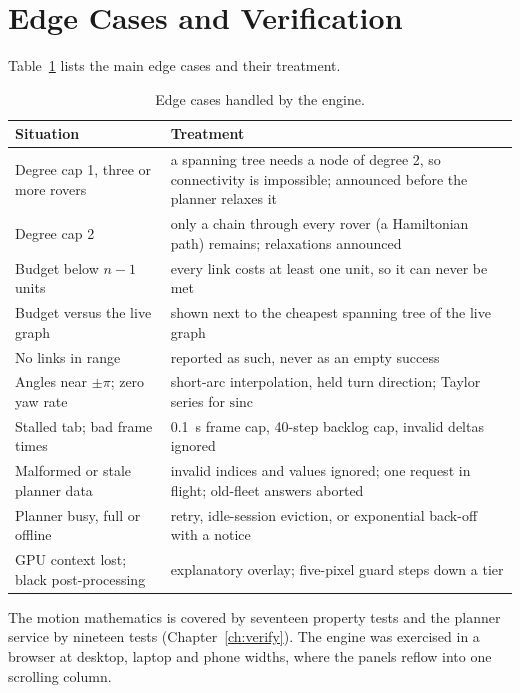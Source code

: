 \section{Edge Cases and Verification}

Table~\ref{tab:eng:edge} lists the main edge cases and their treatment.

\begin{table}[htbp]
\centering
\caption{Edge cases handled by the engine.}
\label{tab:eng:edge}
\small
\begin{tabularx}{\linewidth}{@{}p{4.2cm}X@{}}
\toprule
Situation & Treatment \\
\midrule
Degree cap 1, three or more rovers & a spanning tree needs a node of degree 2, so connectivity is impossible; announced before the planner relaxes it \\
Degree cap 2 & only a chain through every rover (a Hamiltonian path) remains; relaxations announced \\
Budget below $n-1$ units & every link costs at least one unit, so it can never be met \\
Budget versus the live graph & shown next to the cheapest spanning tree of the live graph \\
No links in range & reported as such, never as an empty success \\
Angles near $\pm\pi$; zero yaw rate & short-arc interpolation, held turn direction; Taylor series for $\mathrm{sinc}$ \\
Stalled tab; bad frame times & 0.1~s frame cap, 40-step backlog cap, invalid deltas ignored \\
Malformed or stale planner data & invalid indices and values ignored; one request in flight; old-fleet answers aborted \\
Planner busy, full or offline & retry, idle-session eviction, or exponential back-off with a notice \\
GPU context lost; black post-processing & explanatory overlay; five-pixel guard steps down a tier \\
\bottomrule
\end{tabularx}
\end{table}

The motion mathematics is covered by seventeen property tests and the planner
service by nineteen tests (Chapter~\ref{ch:verify}). The engine was exercised
in a browser at desktop, laptop and phone widths, where the panels reflow into
one scrolling column.



